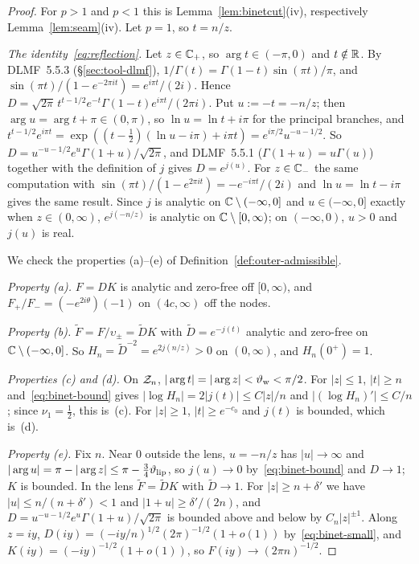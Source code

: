 \begin{proof}
For $p>1$ and $p<1$ this is Lemma~\ref{lem:binetcut}(iv), respectively Lemma~\ref{lem:seam}(iv). Let $p=1$, so $t=n/z$.

\emph{The identity~\eqref{eq:reflection}.} Let $z\in\mathbb{C}_+$, so $\arg t\in(-\pi,0)$ and $t\notin\mathbb{R}$. By DLMF~5.5.3
(\S\ref{sec:tool-dlmf}), $1/\Gamma(t)=\Gamma(1-t)\sin(\pi t)/\pi$, and $\sin(\pi t)/(1-e^{-2\pi it})=e^{i\pi t}/(2i)$.
Hence $D=\sqrt{2\pi}\,t^{t-1/2}e^{-t}\Gamma(1-t)e^{i\pi t}/(2\pi i)$. Put $u:=-t=-n/z$; then $\arg u=\arg t+\pi\in(0,\pi)$,
so $\ln u=\ln t+i\pi$ for the principal branches, and
$t^{t-1/2}e^{i\pi t}=\exp((t-\frac12)(\ln u-i\pi)+i\pi t)=e^{i\pi/2}u^{-u-1/2}$. So
$D=u^{-u-1/2}e^u\Gamma(1+u)/\sqrt{2\pi}$, and DLMF~5.5.1 ($\Gamma(1+u)=u\Gamma(u)$) together with the definition of $j$
gives $D=e^{j(u)}$. For $z\in\mathbb{C}_-$ the same computation with $\sin(\pi t)/(1-e^{2\pi it})=-e^{-i\pi t}/(2i)$ and
$\ln u=\ln t-i\pi$ gives the same result. Since $j$ is analytic on $\mathbb{C}\setminus(-\infty,0]$ and $u\in(-\infty,0]$
exactly when $z\in(0,\infty)$, $e^{j(-n/z)}$ is analytic on $\mathbb{C}\setminus[0,\infty)$; on $(-\infty,0)$, $u>0$ and $j(u)$
is real.

We check the properties (a)--(e) of Definition~\ref{def:outer-admissible}.

\emph{Property (a).} $F=DK$ is analytic and zero-free off $[0,\infty)$, and $F_+/F_-=(-e^{2i\theta})(-1)$ on
$(4c,\infty)$ off the nodes.

\emph{Property (b).} $\tilde F=F/\upsilon_\pm=\tilde DK$ with $\tilde D=e^{-j(t)}$ analytic and zero-free on
$\mathbb{C}\setminus(-\infty,0]$. So $H_n=\tilde D^{-2}=e^{2j(n/z)}>0$ on $(0,\infty)$, and $H_n(0^+)=1$.

\emph{Properties (c) and (d).} On $\mathcal{Z}_n$, $|\arg t|=|\arg z|<\vartheta_{\mathrm{w}}<\pi/2$. For $|z|\le1$, $|t|\ge n$
and~\eqref{eq:binet-bound} gives $|\log H_n|=2|j(t)|\le C|z|/n$ and $|(\log H_n)'|\le C/n$; since $\nu_1=\frac12$, this
is~(c). For $|z|\ge1$, $|t|\ge e^{-c_0}$ and $j(t)$ is bounded, which is~(d).

\emph{Property (e).} Fix $n$. Near $0$ outside the lens, $u=-n/z$ has $|u|\to\infty$ and
$|\arg u|=\pi-|\arg z|\le\pi-\frac34\vartheta_{\mathrm{lip}}$, so $j(u)\to0$ by~\eqref{eq:binet-bound} and $D\to1$; $K$ is bounded. In the
lens $\tilde F=\tilde DK$ with $\tilde D\to1$. For $|z|\ge n+\delta'$ we have $|u|\le n/(n+\delta')<1$ and
$|1+u|\ge\delta'/(2n)$, and $D=u^{-u-1/2}e^u\Gamma(1+u)/\sqrt{2\pi}$ is bounded above and below by $C_n|z|^{\pm1}$. Along
$z=iy$, $D(iy)=(-iy/n)^{1/2}(2\pi)^{-1/2}(1+o(1))$ by~\eqref{eq:binet-small}, and $K(iy)=(-iy)^{-1/2}(1+o(1))$, so
$F(iy)\to(2\pi n)^{-1/2}$.
\end{proof}

